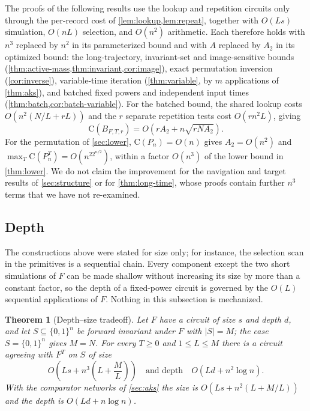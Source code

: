 \documentclass[11pt]{article}
\newtheorem{theorem}{Theorem}[section]
\theoremstyle{definition}
\theoremstyle{remark}
\newcommand{\bits}{\{0,1\}}
\newcommand{\CC}{\mathrm{C}}
\numberwithin{equation}{section}
\begin{document}
The proofs of the following results use the lookup and repetition
circuits only through the per-record cost of \cref{lem:lookup,lem:repeat},
together with $O(Ls)$ simulation, $O(nL)$ selection, and $O(n^2)$
arithmetic.  Each therefore holds with $n^3$ replaced by $n^2$ in its
parameterized bound and with $A$ replaced by $A_2$ in its optimized bound:
the long-trajectory, invariant-set and image-sensitive bounds
(\cref{thm:active-mass,thm:invariant,cor:image}), exact permutation
inversion (\cref{cor:inverse}), variable-time iteration
(\cref{thm:variable}, by $m$ applications of \cref{thm:aks}), and batched
fixed powers and independent input times
(\cref{thm:batch,cor:batch-variable}).  For the batched bound, the shared
lookup costs $O(n^2(N/L+rL))$ and the $r$ separate repetition tests cost
$O(rn^2L)$, giving
\[
  \CC(B_{F,T,r})=O\!\left(rA_2+n\sqrt{rNA_2}\right).
\]
For the permutation of \cref{sec:lower}, $\CC(P_n)=O(n)$ gives $A_2=O(n^2)$
and $\max_T\CC(P_n^T)=O(n^22^{n/2})$, within a factor $O(n^3)$ of the
lower bound in \cref{thm:lower}.  We do not claim the improvement for the
navigation and target results of \cref{sec:structure} or for
\cref{thm:long-time}, whose proofs contain further $n^3$ terms that we
have not re-examined.

\subsection{Depth}\label{sec:depth-size}

The constructions above were stated for size only; for instance, the
selection scan in the primitives is a sequential chain.  Every component
except the two short simulations of $F$ can be made shallow without
increasing its size by more than a constant factor, so the depth of a
fixed-power circuit is governed by the $O(L)$ sequential applications of
$F$.  Nothing in this subsection is mechanized.

\begin{theorem}[Depth--size tradeoff]\label{thm:depth-size}
Let $F$ have a circuit of size $s$ and depth $d$, and let
$S\subseteq\bits^n$ be forward invariant under $F$ with $|S|=M$; the
case $S=\bits^n$ gives $M=N$.  For every $T\geq0$ and $1\leq L\leq M$
there is a circuit agreeing with $F^T$ on $S$ of size
\[
  O\!\left(Ls+n^3\left(L+\frac ML\right)\right)
  \quad\text{and depth}\quad
  O\!\left(Ld+n^2\log n\right).
\]
With the comparator networks of \cref{sec:aks} the size is
$O(Ls+n^2(L+M/L))$ and the depth is $O(Ld+n\log n)$.
\end{theorem}
\end{document}
